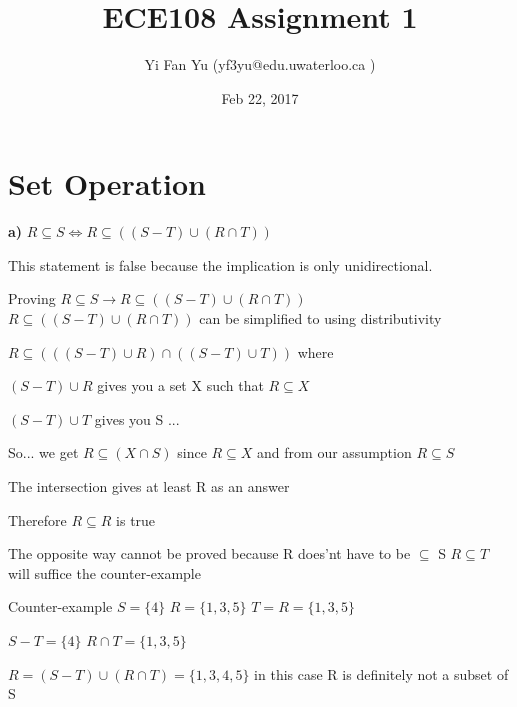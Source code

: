 \documentclass[12pts,A4]{article}
\begin{document}
\title{ECE108 Assignment 1}
\author{Yi Fan Yu (yf3yu@edu.uwaterloo.ca ) }
\date{Feb 22, 2017}
\maketitle


\section{Set Operation}




\begin{flushleft}
    
    \textbf{a)}
    $R \subseteq  S \iff R \subseteq  ((S - T) \cup (R \cap T))$ 


    This statement is false because the implication is only unidirectional. 
\bigskip



Proving $R \subseteq  S \rightarrow R \subseteq  ((S - T) \cup (R \cap T)) $ \\ 



$R \subseteq  ((S - T) \cup (R \cap T))$ can be simplified to using distributivity
\bigskip

$R \subseteq ( (( S - T )\cup R )\cap( ( S - T )\cup T) ) $ where


$( S - T )\cup R$ gives you a set X such that $R \subseteq X$

$ ( S - T )\cup T$  gives you S ...
\bigskip

	So... we get $ R \subseteq  (X \cap S) $ 
since $R \subseteq X$ and from our assumption $R \subseteq S$

The intersection gives at least R as an answer

Therefore
$R \subseteq  R$ is true 
 
\bigskip
The opposite way cannot be proved because R does'nt have to be  $\subseteq$ S
$R \subseteq  T$ will suffice the counter-example
\bigskip

Counter-example $ S = \{4\}$
$R = \{1,3,5\}$
$T = R = \{1,3,5\}$

$S-T = \{4\}$
$R \cap T = \{1,3,5\}$

$ R = (S - T) \cup (R \cap T) = \{1,3,4,5\}$ 
in this case R is definitely not a subset of S



\end{flushleft}

\pagebreak
\end{document}
